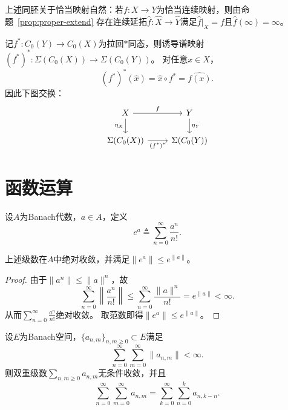 \documentclass[lang=cn,a4paper,newtx,section]{elegantbook}
\begin{document}
\begin{remark}
  上述同胚关于恰当映射自然：若$f: X \to Y$为恰当连续映射，则由命题~\ref{prop:proper-extend} 存在连续延拓$\hat{f}: \hat{X} \to \hat{Y}$满足$\hat{f}|_X = f$且$\hat{f}(\infty)=\infty$。
  
  记$f^*: C_0(Y) \to C_0(X)$为拉回$*$同态，则诱导谱映射$(f^*)^*: \Sigma(C_0(X)) \to \Sigma(C_0(Y))$。
  对任意$x \in X$，
  \begin{equation*}
    (f^*)^*(\hat{x}) = \hat{x} \circ f^* = \widehat{f(x)}.
  \end{equation*}
  因此下图交换：
  \begin{equation*}
    \begin{tikzcd}
      X \arrow[r, "f"] \arrow[d, "\eta_X"'] & Y \arrow[d, "\eta_Y"] \\
      \Sigma(C_0(X)) \arrow[r, "(f^*)^*"'] & \Sigma(C_0(Y))
    \end{tikzcd}
  \end{equation*}
\end{remark}

\section{函数运算}

\begin{definition}[指数函数]
  设$A$为Banach代数，$a \in A$，定义
  \begin{equation*}
    e^a \triangleq \sum_{n=0}^\infty \frac{a^n}{n!}.
  \end{equation*}
\end{definition}

\begin{lemma}
  上述级数在$A$中绝对收敛，并满足$\|e^a\| \leq e^{\|a\|}$。
\end{lemma}

\begin{proof}
  由于$\|a^n\| \leq \|a\|^n$，故
  \begin{equation*}
    \sum_{n=0}^\infty \left\|\frac{a^n}{n!}\right\|
    \leq \sum_{n=0}^\infty \frac{\|a\|^n}{n!}
    = e^{\|a\|} < \infty.
  \end{equation*}
  从而$\sum_{n=0}^\infty \frac{a^n}{n!}$绝对收敛。
  取范数即得$\|e^a\| \leq e^{\|a\|}$。
\end{proof}

\begin{lemma}[双重级数重排]
  设$E$为Banach空间，$\{a_{n,m}\}_{n,m \geq 0} \subset E$满足
  \begin{equation*}
    \sum_{n=0}^\infty \sum_{m=0}^\infty \|a_{n,m}\| < \infty.
  \end{equation*}
  则双重级数$\sum_{n,m \geq 0} a_{n,m}$无条件收敛，并且
  \begin{equation*}
    \sum_{n=0}^\infty \sum_{m=0}^\infty a_{n,m}
    = \sum_{k=0}^\infty \sum_{n=0}^k a_{n,k-n}.
  \end{equation*}
\end{lemma}
\end{document}
